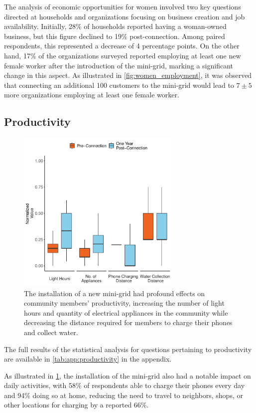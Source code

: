 The analysis of economic opportunities for women involved two key questions directed at households and organizations focusing on business creation and job availability. Initially, 28\% of households reported having a woman-owned business, but this figure declined to 19\% post-connection. Among paired respondents, this represented a decrease of 4 percentage points. On the other hand, 17\% of the organizations surveyed reported employing at least one new female worker after the introduction of the mini-grid, marking a significant change in this aspect. As illustrated in \cref{fig:women_employment}, it was observed that connecting an additional 100 customers to the mini-grid would lead to $7\pm5$ more organizations employing at least one female worker.

\subsection{Productivity}
\begin{figure}[th]
	\centering
	\includegraphics[width=0.7\textwidth]{images/productivity_paired_results.pdf}
	\caption{The installation of a new mini-grid had profound effects on community members' productivity, increasing the number of light hours and quantity of electrical appliances in the community while decreasing the distance required for members to charge their phones and collect water.}
	\label{fig:productivity_paired_results}
\end{figure}
The full results of the statistical analysis for questions pertaining to productivity are available in \cref{tab:app:productivity} in the appendix.

As illustrated in \cref{fig:productivity_paired_results}, the installation of the mini-grid also had a notable impact on daily activities, with 58\% of respondents able to charge their phones every day and 94\% doing so at home, reducing the need to travel to neighbors, shops, or other locations for charging by a reported 66\%.

